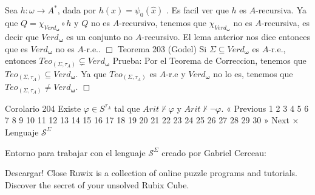 Sea \(h:\omega \rightarrow A^{\ast }\), dada por \(h(x)=\psi _{0}(\widehat{x})\) . Es facil ver que \(h\) es \(A\)-recursiva. Ya que \(Q=\chi _{Verd_{\mathbf{ \omega }}}\circ h\) y \(Q\) no es \(A\)-recursivo, tenemos que \(\chi _{Verd_{ \mathbf{\omega }}}\) no es \(A\)-recursiva, es decir que \(Verd_{\mathbf{\omega } }\) es un conjunto no \(A\)-recursivo. El lema anterior nos dice entonces que es \(Verd_{\mathbf{\omega }}\) no es \(A\)-r.e.. \(\Box\)
Teorema 203 (Godel) Si \(\Sigma \subseteq Verd_{\mathbf{\omega }}\) es \(A\)-r.e., entonces \( Teo_{(\Sigma ,\tau _{A})}\subsetneq Verd_{\mathbf{\omega }}\)
Prueba: Por el Teorema de Correccion, tenemos que \(Teo_{(\Sigma ,\tau _{A})}\subseteq Verd_{\mathbf{\omega }}\). Ya que \(Teo_{(\Sigma ,\tau _{A})}\) es \(A\)-r.e y \(Verd_{\mathbf{\omega }}\) no lo es, tenemos que \(Teo_{(\Sigma ,\tau _{A})}\neq Verd_{\mathbf{\omega }}\). \(\Box\)

Corolario 204 Existe \(\varphi \in S^{\tau _{A}}\) tal que \(Arit\nvdash \varphi \) y \( Arit\nvdash \lnot \varphi \).
« Previous
1
2
3
4
5
6
7
8
9
10
11
12
13
14
15
16
17
18
19
20
21
22
23
24
25
26
27
28
29
30
» Next
×
Lenguaje \(\mathcal{S}^{\Sigma }\)

Entorno para trabajar con el lenguaje \(\mathcal{S}^{\Sigma }\) creado por Gabriel Cerceau:

Descargar!
Close
Ruwix is a collection of online puzzle programs and tutorials. Discover the secret of your unsolved Rubix Cube.
